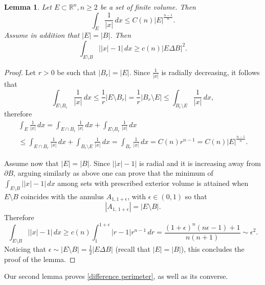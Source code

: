 \documentclass[reqno,11pt]{amsart}
\makeatletter
\def\ez{\epsilon}
\newtheorem{lem}[thm]{Lemma}%
\numberwithin{equation}{section}
\theoremstyle{remark}
\makeatother
\begin{document}
\begin{lem}
\label{lem:1 x}
Let $E\subset \mathbb R^n, n\ge 2$ be a set of finite volume.
Then
$$
\int_E\frac{1}{|x|}\,dx \leq C(n)|E|^{\frac{n-1}{n}}.
$$
Assume in addition that $|E|=|B|$. Then 
\begin{equation}\label{GB}
\int_{E\setminus B} \left||x|-1\right|\, dx\ge  c(n) |E\Delta B|^2.
\end{equation}
\end{lem}
\begin{proof}
Let $r>0$ be such that $|B_r|=|E|$. Since $\frac 1 {|x|}$ is radially decreasing, 
it follows that 
$$
\int_{E\setminus B_r}\frac 1 {|x|}\,dx \leq \frac1r |E\setminus B_r|=\frac{1}{r}|B_r\setminus E|\leq \int_{B_r\setminus E}\frac 1 {|x|}\,dx,
$$
therefore
\begin{multline*}
\int_E\frac{1}{|x|}\,dx=\int_{E\cap B_r}\frac{1}{|x|}\,dx+\int_{E\setminus B_r}\frac 1 {|x|}\,dx \\
\leq \int_{E\cap B_r}\frac{1}{|x|}\,dx+\int_{B_r\setminus E}\frac 1 {|x|}\,dx
= \int_{B_r}\frac{1}{|x|}\,dx=C(n)r^{n-1}=C(n)|E|^{\frac{n-1}{n}}.    
\end{multline*}


Assume  now that $|E|=|B|$. Since $\left||x|-1\right|$ is radial and it is increasing away from $\partial B$, arguing similarly as above one can prove that the minimum  of $\int_{E\setminus B} \left||x|-1\right|\,dx$ among sets with prescribed exterior volume is attained when $E\setminus B$ coincides with the annulus $A_{1, 1+\ez}$, with $\ez \in (0,1)$ so that
$$|A_{1,\,1+\ez}|=|E\setminus B|.$$
Therefore
\begin{equation}
    \int_{ E\setminus B} \left||x|-1\right|\, dx \ge   c(n)\int_{1}^{1+\ez} |r-1|r^{n-1}\, dr  
=   \frac{(1+\ez)^{n}(n\ez-1)+1}{n(n+1)} \sim \ez^2.\label{epsilons} 
\end{equation}
Noticing that $\ez\sim |E\setminus B|=\frac12|E\Delta B|$ (recall that $|E|=|B|$),
this concludes the proof of the lemma.
\end{proof}

Our second lemma proves \eqref{difference perimeter}, as well as its converse.
 
\end{document}
